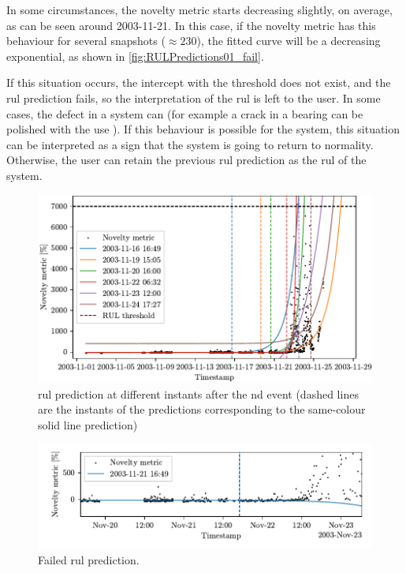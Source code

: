 In some circumstances, the novelty metric starts decreasing slightly, on average, as can be seen around 2003-11-21. In this case, if the novelty metric has this behaviour for several snapshots ($\approx 230$), the fitted curve will be a decreasing exponential, as shown in \autoref{fig:RULPredictions01_fail}. 

If this situation occurs, the intercept with the threshold does not exist, and the \gls{rul} prediction fails, so the interpretation of the \gls{rul} is left to the user. In some cases, the defect in a system can  (for example a crack in a bearing can be polished with the use \cite{IMSpaper}). If this behaviour is possible for the system, this situation can be interpreted as a sign that the system is going to return to normality. Otherwise, the user can retain the previous \gls{rul} prediction as the \gls{rul} of the system.

\begin{figure}
    \includegraphics{images/IMS/Novelty_01_500samples_bearing3x_predictions.pdf}
    \caption{\gls{rul} prediction at different instants after the \gls{nd} event (dashed lines are the instants of the predictions corresponding to the same-colour solid line prediction)}
    \label{fig:RULPredictions01}
\end{figure}

\begin{figure}
    \includegraphics{images/IMS/Novelty_01_500samples_bearing3x_predictions_failed.pdf}
    \caption{Failed \gls{rul} prediction.}
    \label{fig:RULPredictions01_fail}
\end{figure}

